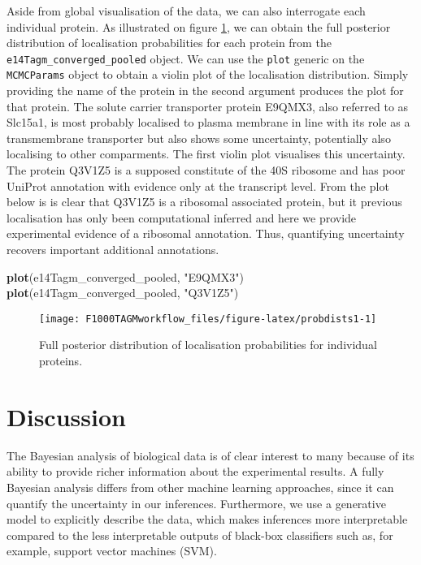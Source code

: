 \documentclass[9pt,a4paper,]{extarticle}
\newenvironment{Shaded}{\begin{snugshade}}{\end{snugshade}}
\newcommand{\KeywordTok}[1]{\textcolor[rgb]{0.13,0.29,0.53}{\textbf{#1}}}
\newcommand{\NormalTok}[1]{#1}
\newcommand{\StringTok}[1]{\textcolor[rgb]{0.31,0.60,0.02}{#1}}
\begin{document}
Aside from global visualisation of the data, we can also interrogate
each individual protein. As illustrated on figure
\ref{fig:probdists1}, we can obtain the full posterior distribution
of localisation probabilities for each protein from the
\texttt{e14Tagm\_converged\_pooled} object. We can use the \texttt{plot} generic on
the \texttt{MCMCParams} object to obtain a violin plot of the localisation
distribution. Simply providing the name of the protein in the second
argument produces the plot for that protein. The solute carrier
transporter protein E9QMX3, also referred to as Slc15a1, is most
probably localised to plasma membrane in line with its role as a
transmembrane transporter but also shows some uncertainty, potentially
also localising to other comparments. The first violin plot
visualises this uncertainty. The protein Q3V1Z5 is a supposed
constitute of the 40S ribosome and has poor UniProt annotation with
evidence only at the transcript level. From the plot below is is clear
that Q3V1Z5 is a ribosomal associated protein, but it previous
localisation has only been computational inferred and here we provide
experimental evidence of a ribosomal annotation. Thus, quantifying
uncertainty recovers important additional annotations.

\begin{Shaded}
\begin{Highlighting}[]
\KeywordTok{plot}\NormalTok{(e14Tagm_converged_pooled, }\StringTok{"E9QMX3"}\NormalTok{)}
\KeywordTok{plot}\NormalTok{(e14Tagm_converged_pooled, }\StringTok{"Q3V1Z5"}\NormalTok{)}
\end{Highlighting}
\end{Shaded}

\begin{figure}

{\centering \texttt{[image: F1000TAGMworkflow\_files/figure-latex/probdists1-1]} 

}

\caption{Full posterior distribution of localisation probabilities for individual proteins.}\label{fig:probdists1}
\end{figure}

\hypertarget{discussion}{%
\section{Discussion}\label{discussion}}

The Bayesian analysis of biological data is of clear interest to many
because of its ability to provide richer information about the
experimental results. A fully Bayesian analysis differs from other
machine learning approaches, since it can quantify the uncertainty in
our inferences. Furthermore, we use a generative model to explicitly
describe the data, which makes inferences more interpretable compared to
the less interpretable outputs of black-box classifiers such as, for
example, support vector machines (SVM).
\end{document}
